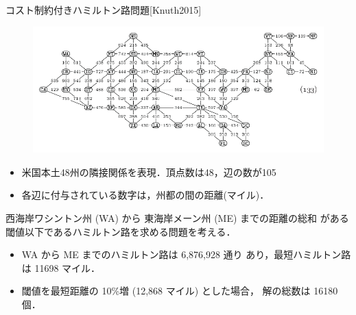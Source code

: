 \documentclass[dvipdfmx,10pt]{beamer}
\begin{document}
\begin{frame}{コスト制約付きハミルトン路問題[Knuth2015]}
  \begin{figure}[tb]
  \centering
  \includegraphics[width=0.8\linewidth]{fig/taocp_vol4fasc1b_p52_eq133.pdf}
  \end{figure}
  \begin{itemize}  
  \item 米国本土48州の隣接関係を表現．頂点数は48，辺の数が105
  \item 各辺に付与されている数字は，州都の間の距離(マイル)．
  \end{itemize}
  \begin{block}{}
    西海岸ワシントン州 (WA) から 東海岸メーン州 (ME) までの距離の総和
    がある閾値以下であるハミルトン路を求める問題を考える．
  \end{block}
  \begin{itemize}
  \item WA から ME までのハミルトン路は 6,876,928 通り
    あり，最短ハミルトン路は 11698 マイル．
  \item 閾値を最短距離の 10\%増 (12,868 マイル) とした場合，
    解の総数は 16180 個．
  \end{itemize}
\end{frame}
\end{document}
